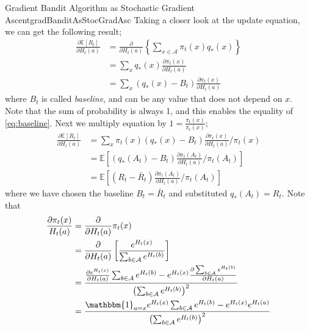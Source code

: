 \documentclass[../../main.tex]{subfiles}
\begin{document}
\begin{rem}{Gradient Bandit Algorithm as Stochastic Gradient Ascent}{gradBanditAsStocGradAsc}
                Taking a closer look at the update equation, we can get the following result;
                \begin{align}
                    \frac{\partial\mathbb{E}[R_t]}{\partial H_t(a)}
                    &= \frac{\partial}{\partial H_t(a)}\left\{ \sum_{x \in \mathcal{A}}\pi_t(x)q_*(x) \right\}
                    \\ &= \sum_{x}q_*(x)\frac{\partial \pi_t(x)}{\partial H_t(a)}
                    \\ &= \sum_{x}(q_*(x)-B_t)\frac{\partial \pi_t(x)}{\partial H_t(a)} \label{eq:baseline}
                \end{align}
                where $B_t$ is called \emph{baseline}, and can be any value that does not depend on $x$. Note that the sum of probability is always 1,
                and this enables the equality of \ref{eq:baseline}. Next we multiply equation by $1=\frac{\pi_t(x)}{\pi_t(x)}$;
                \begin{align}
                    \frac{\partial\mathbb{E}[R_t]}{\partial H_t(a)}
                    &= \sum_{x}\pi_t(x)(q_*(x)-B_t)\frac{\partial \pi_t(x)}{\partial H_t(a)}/\pi_t(x)
                    \\ &= \mathbb{E}\left[ (q_*(A_t)-B_t)\frac{\partial \pi_t(A_t)}{\partial H_t(a)}/\pi_t(A_t) \right]
                    \\ &= \mathbb{E}\left[ (R_t-\bar{R}_t)\frac{\partial \pi_t(A_t)}{\partial H_t(a)}/\pi_t(A_t) \right] \label{eq:substitute}
                \end{align}
                where we have chosen the baseline $B_t=\bar{R}_t$ and substituted $q_*(A_t)=R_t$.
                Note that
                \begin{align}
                    \frac{\partial\pi_t(x)}{H_t(a)}
                    &= \frac{\partial}{\partial H_t(a)}\pi_t(x)
                    \\ &= \frac{\partial}{\partial H_t(a)}\left[ \frac{e^{H_t(x)}}{\sum_{b \in \mathcal{A}}e^{H_t(b)}} \right]
                    \\ &= \frac{ \frac{\partial e^{H_t(x)}}{\partial H_t(a)}\sum_{b \in \mathcal{A}}e^{H_t(b)} - e^{H_t(x)}\frac{\partial \sum_{b \in \mathcal{A}}e^{H_t(b)}}{\partial H_t(a)} }
                               {\left( \sum_{b \in \mathcal{A}}e^{H_t(b)} \right)^2}
                    \\ &= \frac{\mathbbm{1}_{a=x}e^{H_t(x)}\sum_{b \in \mathcal{A}}e^{H_t(b)}-e^{H_t(x)}e^{H_t(a)}}
                               {\left( \sum_{b \in \mathcal{A}}e^{H_t(b)} \right)^2}

\end{align}
\end{rem}
\end{document}

